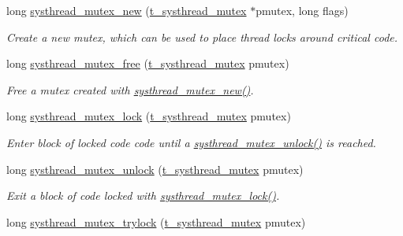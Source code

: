 \begin{DoxyCompactItemize}
\item 
long \hyperlink{group__mutex_gaa8cae78764c59883566ac4f861dd534e}{systhread\_\-mutex\_\-new} (\hyperlink{group__threading_ga503de6f3f546ef1dd2bed57a13d9812c}{t\_\-systhread\_\-mutex} $\ast$pmutex, long flags)
\begin{DoxyCompactList}\small\item\em Create a new mutex, which can be used to place thread locks around critical code. \item\end{DoxyCompactList}\item 
long \hyperlink{group__mutex_ga5fdfbb20bfe5b9e6b223436758ea88b1}{systhread\_\-mutex\_\-free} (\hyperlink{group__threading_ga503de6f3f546ef1dd2bed57a13d9812c}{t\_\-systhread\_\-mutex} pmutex)
\begin{DoxyCompactList}\small\item\em Free a mutex created with \hyperlink{group__mutex_gaa8cae78764c59883566ac4f861dd534e}{systhread\_\-mutex\_\-new()}. \item\end{DoxyCompactList}\item 
long \hyperlink{group__mutex_ga6a3bea4c2f5e5d133d25d78b51fb15bf}{systhread\_\-mutex\_\-lock} (\hyperlink{group__threading_ga503de6f3f546ef1dd2bed57a13d9812c}{t\_\-systhread\_\-mutex} pmutex)
\begin{DoxyCompactList}\small\item\em Enter block of locked code code until a \hyperlink{group__mutex_ga74aae707e650844be8a4e51a217c9b5f}{systhread\_\-mutex\_\-unlock()} is reached. \item\end{DoxyCompactList}\item 
long \hyperlink{group__mutex_ga74aae707e650844be8a4e51a217c9b5f}{systhread\_\-mutex\_\-unlock} (\hyperlink{group__threading_ga503de6f3f546ef1dd2bed57a13d9812c}{t\_\-systhread\_\-mutex} pmutex)
\begin{DoxyCompactList}\small\item\em Exit a block of code locked with \hyperlink{group__mutex_ga6a3bea4c2f5e5d133d25d78b51fb15bf}{systhread\_\-mutex\_\-lock()}. \item\end{DoxyCompactList}\item 
long \hyperlink{group__mutex_gafa0cef91ad29e8e0625d35eadde52002}{systhread\_\-mutex\_\-trylock} (\hyperlink{group__threading_ga503de6f3f546ef1dd2bed57a13d9812c}{t\_\-systhread\_\-mutex} pmutex)

\end{DoxyCompactItemize}
